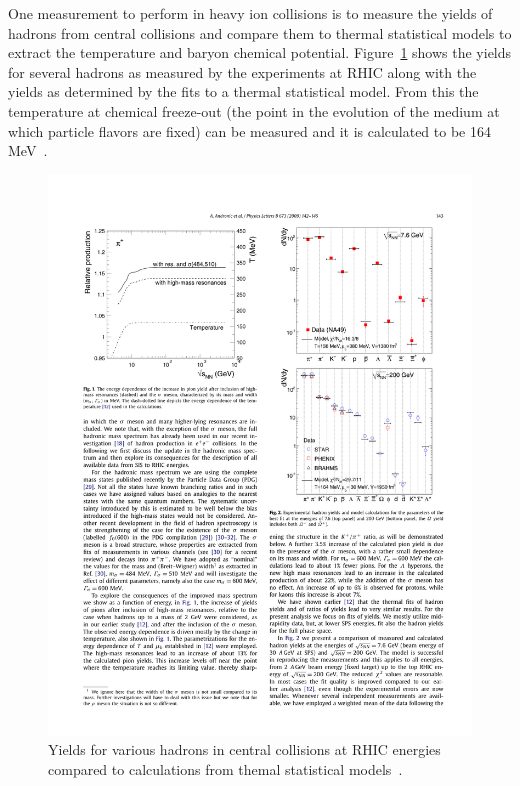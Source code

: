 One measurement to perform in heavy ion collisions is to measure the yields of hadrons from central collisions and compare them to thermal statistical models to extract the temperature and baryon chemical potential. Figure~\ref{fig:hadron_yields} shows the yields for several hadrons as measured by the experiments at RHIC along with the yields as determined by the fits to a thermal statistical model. From this the temperature at chemical freeze-out (the point in the evolution of the medium at which particle flavors are fixed) can be measured and it is calculated to be 164 MeV~\cite{thermstat}.

\begin{figure}[htbp]
\begin{center}
\includegraphics[scale=1.2]{Plots/Intro/had_yields.pdf}
\end{center}
\caption[Hadron Yields]{Yields for various hadrons in central collisions at RHIC energies compared to calculations from themal statistical models~\cite{thermstat}.}
\label{fig:hadron_yields}
\end{figure}


